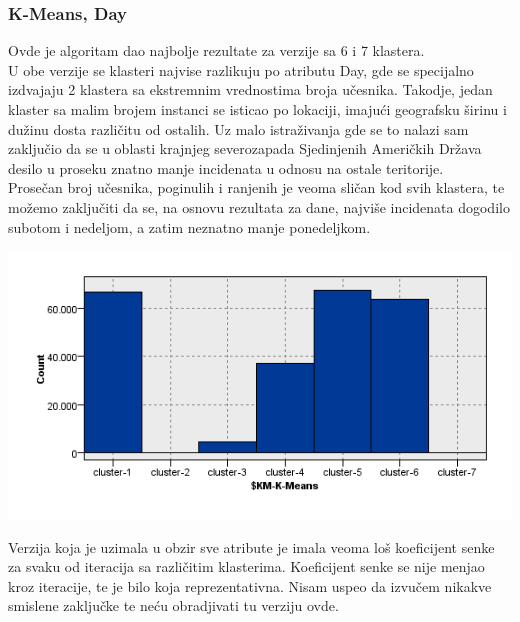 \documentclass[
	12pt,			
	openright,		
	oneside,			
	a4paper,		
	english,			
	]{article}
\begin{document}
    \subsubsection{K-Means, Day}
    Ovde je algoritam dao najbolje rezultate za verzije sa 6 i 7 klastera. \\
    U obe verzije se klasteri najvise razlikuju po atributu Day, gde se specijalno izdvajaju 2 klastera sa ekstremnim vrednostima broja učesnika.
    Takodje, jedan klaster sa malim brojem instanci se isticao po lokaciji, imajući geografsku širinu i dužinu dosta različitu od ostalih. Uz malo istraživanja gde se to nalazi sam zaključio da se u oblasti krajnjeg severozapada Sjedinjenih Američkih Država  desilo u proseku znatno manje incidenata u odnosu na ostale teritorije.\\
    Prosečan broj učesnika, poginulih i ranjenih je veoma sličan kod svih klastera, te možemo zaključiti da se, na osnovu rezultata za dane, najviše incidenata dogodilo subotom i nedeljom, a zatim neznatno manje ponedeljkom.
    
    \begin{center}
    \includegraphics[width = 15cm]{Slike/KMDay7.png}
    \end{center}
    
    Verzija koja je uzimala u obzir sve atribute je imala veoma loš koeficijent senke za svaku od iteracija sa različitim klasterima.
    Koeficijent senke se nije menjao kroz iteracije, te je bilo koja reprezentativna. Nisam uspeo da izvučem nikakve smislene zaključke te neću obradjivati tu verziju ovde.
\newpage
\end{document}
